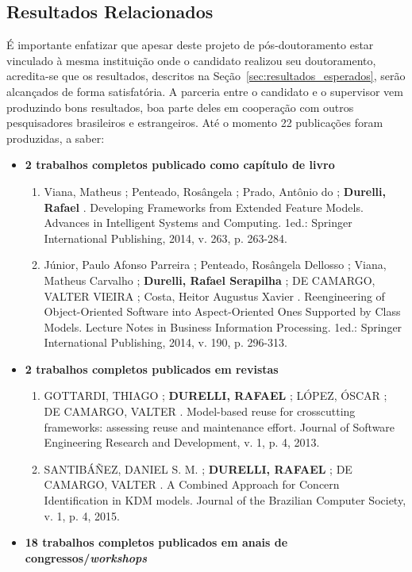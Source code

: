 \documentclass[12pt]{article}
\begin{document}
\subsection{Resultados Relacionados}

É importante enfatizar que apesar deste projeto de pós-doutoramento estar vinculado à mesma instituição onde o candidato realizou seu doutoramento, acredita-se que os resultados, descritos na Seção~\ref{sec:resultados_esperados}, serão alcançados de forma satisfatória. A parceria entre o candidato e o supervisor vem produzindo bons resultados, boa parte deles em cooperação com outros pesquisadores brasileiros e estrangeiros. Até o momento 22 publicações foram produzidas, a saber:

\begin{itemize}
	
	\item \textbf{2 trabalhos completos publicado como capítulo de livro}
		\begin{enumerate}
			
			\item Viana, Matheus ; Penteado, Rosângela ; Prado, Antônio do ; \textbf{Durelli, Rafael} . Developing Frameworks from Extended Feature Models. Advances in Intelligent Systems and Computing. 1ed.: Springer International Publishing, 2014, v. 263, p. 263-284.
			\item Júnior, Paulo Afonso Parreira ; Penteado, Rosângela Dellosso ; Viana, Matheus Carvalho ; \textbf{Durelli, Rafael Serapilha} ; DE CAMARGO, VALTER VIEIRA ; Costa, Heitor Augustus Xavier . Reengineering of Object-Oriented Software into Aspect-Oriented Ones Supported by Class Models. Lecture Notes in Business Information Processing. 1ed.: Springer International Publishing, 2014, v. 190, p. 296-313.
			
		\end{enumerate}
	
	\item \textbf{2 trabalhos completos publicados em revistas}
		\begin{enumerate}
			\item GOTTARDI, THIAGO ; \textbf{DURELLI, RAFAEL} ; LÓPEZ, ÓSCAR ; DE CAMARGO, VALTER . Model-based reuse for crosscutting frameworks: assessing reuse and maintenance effort. Journal of Software Engineering Research and Development, v. 1, p. 4, 2013.
			\item SANTIBÁÑEZ, DANIEL S. M. ; \textbf{DURELLI, RAFAEL} ; DE CAMARGO, VALTER . A Combined Approach for Concern Identification in KDM models. Journal of the Brazilian Computer Society, v. 1, p. 4, 2015.
		\end{enumerate}
	\item \textbf{18 trabalhos completos publicados em anais de congressos/\textit{workshops}}
	\begin{enumerate}
	    

\end{enumerate}
\end{itemize}
\end{document}
